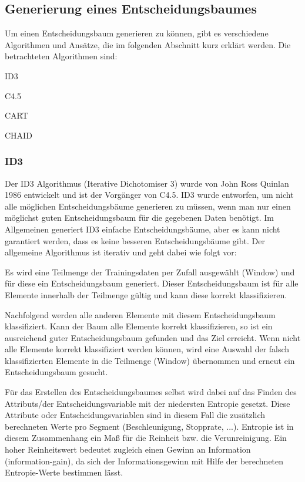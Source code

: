 \subsection{Generierung eines Entscheidungsbaumes}
\label{entscheidungsbaumAlgorithmen}
Um einen Entscheidungsbaum generieren zu können, gibt es verschiedene Algorithmen und Ansätze, die im folgenden Abschnitt kurz erklärt werden. Die betrachteten Algorithmen sind:
\begin{pitemize}
\item ID3
\item C4.5
\item CART
\item CHAID
\end{pitemize}

\subsubsection{ID3}
Der ID3 Algorithmus (Iterative Dichotomiser 3) wurde von John Ross Quinlan 1986 entwickelt und ist der Vorgänger von C4.5. ID3 wurde entworfen, um nicht alle möglichen Entscheidungsbäume generieren zu müssen, wenn man nur einen möglichst guten Entscheidungsbaum für die gegebenen Daten benötigt. Im Allgemeinen generiert ID3 einfache Entscheidungsbäume, aber es kann nicht garantiert werden, dass es keine besseren Entscheidungsbäume gibt. Der allgemeine Algorithmus ist iterativ und geht dabei wie folgt vor: \cite{john_ross_quinlan_1986}

\begin{pitemize}
\item Es wird eine Teilmenge der Trainingsdaten per Zufall ausgewählt (Window) und für diese ein Entscheidungsbaum generiert. Dieser Entscheidungsbaum ist für alle Elemente innerhalb der Teilmenge gültig und kann diese korrekt klassifizieren. 
\item Nachfolgend werden alle anderen Elemente mit diesem Entscheidungsbaum klassifiziert. Kann der Baum alle Elemente korrekt klassifizieren, so ist ein ausreichend guter Entscheidungsbaum gefunden und das Ziel erreicht. Wenn nicht alle Elemente korrekt klassifiziert werden können, wird eine Auswahl der falsch klassifizierten Elemente in die Teilmenge (Window) übernommen und erneut ein Entscheidungsbaum gesucht. 
\end{pitemize}

Für das Erstellen des Entscheidungsbaumes selbst wird dabei auf das Finden des Attributs/der Entscheidungsvariable mit der niedersten Entropie gesetzt. Diese Attribute oder Entscheidungsvariablen sind in diesem Fall die zusätzlich berechneten Werte pro Segment (Beschleunigung, Stopprate, ...). Entropie ist in diesem Zusammenhang ein Maß für die Reinheit bzw. die Verunreinigung. \cite{howard_hamilton_machine_2009} Ein hoher Reinheitswert bedeutet zugleich einen Gewinn an Information (information-gain), da sich der Informationsgewinn mit Hilfe der berechneten Entropie-Werte bestimmen lässt. \cite{thomas_mitchell_which_1997}


